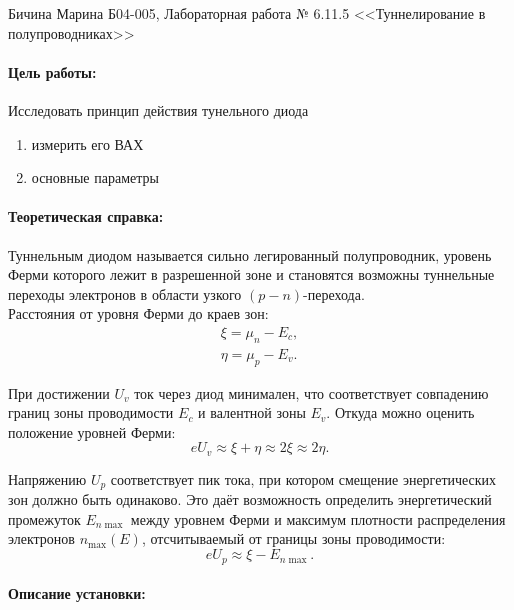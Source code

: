 \documentclass[a4paper,12pt]{article}
\author{Бичина Марина 
группа Б04-005 1 курса ФЭФМ}
\title{}
\date{}
\begin{document}

\begin{center}
\begin{Large}
{Бичина Марина Б04-005, Лабораторная работа № 6.11.5 <<Туннелирование в полупроводниках>>}
\end{Large}
\end{center}
\paragraph{Цель работы:} Исследовать принцип действия тунельного диода 
\begin{enumerate}
\itemsep0em
\item измерить его ВАХ
\item основные параметры
\end{enumerate} 
\paragraph{Теоретическая справка:}
Туннельным диодом называется сильно легированный полупроводник, уровень Ферми которого лежит в разрешенной зоне и становятся возможны туннельные переходы электронов в области узкого $(p-n)$-перехода. 
\\
Расстояния от уровня Ферми до краев зон:
	\begin{equation*}
		\begin{gathered}
			\xi = \mu_n - E_c,\\
			\eta = \mu_p - E_v.
		\end{gathered}
	\end{equation*}

	 При достижении $U_v$ ток через диод минимален, что соответствует совпадению границ зоны проводимости $E_c$ и валентной зоны $E_v$. Откуда можно оценить положение уровней Ферми:
	\begin{equation*}
		eU_v \approx \xi + \eta \approx 2\xi \approx 2\eta.
	\end{equation*}

	Напряжению $U_p$ соответствует пик тока, при котором смещение энергетических зон должно быть одинаково. Это даёт возможность определить энергетический промежуток $E_{n \max}$ между уровнем Ферми и максимум плотности распределения электронов $n_{\max}(E)$, отсчитываемый от границы зоны проводимости:
	\begin{equation*}
		eU_p \approx \xi - E_{n\max}.
	\end{equation*}

\paragraph{Описание установки:}
\end{document}

